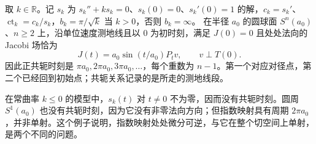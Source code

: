 \begin{example}\label{g3:exm:model-conjugate-points}
	取 \(k\in\mathbb R\)。记 \(s_k\) 为 \(s_k''+ks_k=0\)、\(s_k(0)=0\)、\(s_k'(0)=1\) 的解，\(c_k=s_k'\)、\(\operatorname{ct}_k=c_k/s_k\)，\(b_k=\pi/\sqrt k\) 当 \(k>0\)，否则 \(b_k=\infty\)。
	在半径 \(a_0\) 的圆球面 \(S^n(a_0)\)、\(n\ge2\) 上，沿单位速度测地线且以 \(0\) 为初时刻，满足 \(J(0)=0\) 且处处法向的 Jacobi 场恰为
	\[
		J(t)=a_0\sin(t/a_0)P_tv,\qquad v\perp T(0).
	\]
	因此正共轭时刻是 \(\pi a_0,2\pi a_0,3\pi a_0,\ldots\)，每个重数为 \(n-1\)。第一个对应对径点，第二个已经回到初始点；共轭关系记录的是所走的测地线段。

	在常曲率 \(k\le0\) 的模型中，\(s_k(t)\) 对 \(t\ne0\) 不为零，因而没有共轭时刻。圆周 \(S^1(a_0)\) 也没有共轭时刻，因为它没有非零法向方向；但指数映射具有周期 \(2\pi a_0\)，并非单射。这个例子说明，指数映射处处微分可逆，与它在整个切空间上单射，是两个不同的问题。
\end{example}
